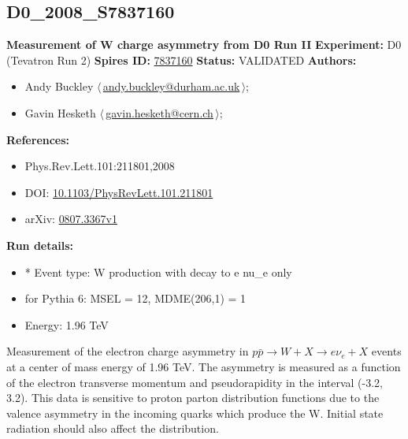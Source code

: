 \clearpage


\clearpage

\subsection[D0\_2008\_S7837160]{D0\_2008\_S7837160\,\cite{Abazov:2008qv}}
\textbf{Measurement of W charge asymmetry from D0 Run II}\newline
\textbf{Experiment:} D0 (Tevatron Run 2) \newline
\textbf{Spires ID:} \href{http://www.slac.stanford.edu/spires/find/hep/www?rawcmd=key+7837160}{7837160}\newline
\textbf{Status:} VALIDATED\newline
\textbf{Authors:}
\begin{itemize}
  \item Andy Buckley $\langle\,$\href{mailto:andy.buckley@durham.ac.uk}{andy.buckley@durham.ac.uk}$\,\rangle$;
  \item Gavin Hesketh $\langle\,$\href{mailto:gavin.hesketh@cern.ch}{gavin.hesketh@cern.ch}$\,\rangle$;
\end{itemize}
\textbf{References:}
\begin{itemize}
  \item Phys.Rev.Lett.101:211801,2008
  \item DOI: \href{http://dx.doi.org/10.1103/PhysRevLett.101.211801}{10.1103/PhysRevLett.101.211801}
  \item arXiv: \href{http://arxiv.org/abs/0807.3367v1}{0807.3367v1}
\end{itemize}
\textbf{Run details:}
\begin{itemize}

  \item * Event type: W production with decay to e nu_e only  
  \item for Pythia 6: MSEL = 12, MDME(206,1) = 1
  \item Energy: 1.96 TeV\end{itemize}

\noindent Measurement of the electron charge asymmetry in $p \bar p \to W + X \to e \nu_e + X$ events at a center of mass energy of 1.96 TeV. The asymmetry is measured as a function of the electron transverse momentum and pseudorapidity in the interval (-3.2, 3.2).  This data is sensitive to proton parton distribution functions due to the valence asymmetry in the incoming quarks which produce the W. Initial state radiation should also affect the \pT distribution.

